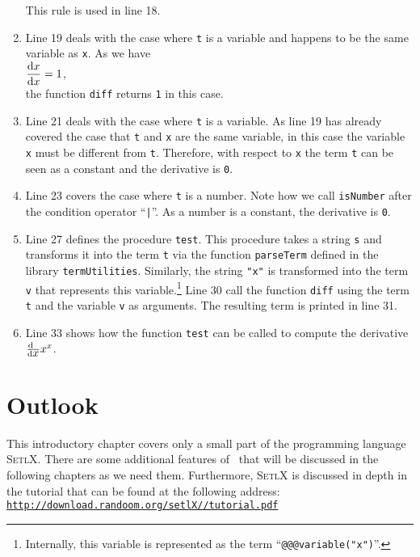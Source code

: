 \begin{enumerate}
      This rule is used in line 18.
\item Line 19 deals with the case where \texttt{t} is a variable and happens to be the same variable as
      \texttt{x}.  As we have
      \\[0.2cm]
      \hspace*{1.3cm}
      $\displaystyle \frac{\mathrm{d}x}{\mathrm{d}x} = 1$,
      \\[0.2cm]
      the function \texttt{diff} returns \texttt{1} in this case.
\item Line 21 deals with the case where \texttt{t} is a variable.  As line 19 has already covered the case that
      \texttt{t} and \texttt{x} are the same variable, in this case the variable \texttt{x} must be different
      from \texttt{t}.  Therefore, with respect to \texttt{x} the term \texttt{t} can be seen as a constant and
      the derivative is \texttt{0}.
\item Line 23 covers the case where \texttt{t} is a number.  Note how we call \texttt{isNumber}
      after the condition operator ``\texttt{|}''.  As a number is a constant, the derivative is \texttt{0}.
\item Line 27 defines the procedure \texttt{test}.  This procedure takes a string \texttt{s} and transforms it
      into the term \texttt{t} via the function \texttt{parseTerm} defined in the library
      \texttt{termUtilities}.  Similarly, the string \texttt{"x"} is transformed into the term \texttt{v} that
      represents this variable.\footnote{Internally, this variable is represented as the term
      ``\texttt{@@@variable("x")}''.}
      Line 30 call the function \texttt{diff} using the term \texttt{t} and the variable \texttt{v}
      as arguments.  The resulting term is printed in line 31.
\item Line 33 shows how the function \texttt{test} can be called to compute the derivative $\frac{\textrm{d}\;\;}{\textrm{d}\mbox{$x$}} x^x$.
\end{enumerate}
\pagebreak

\section{Outlook}
This introductory chapter covers only a small part of the programming language  \textsc{SetlX}.  There are some
additional features of \setlx\ that will be discussed in the following chapters as we need them.
Furthermore,  \textsc{SetlX} is discussed in depth in the tutorial that can be found at the following address:
\\[0.2cm]
\hspace*{1.3cm}
\href{http://download.randoom.org/setlX//tutorial.pdf}{\texttt{http://download.randoom.org/setlX//tutorial.pdf}}


